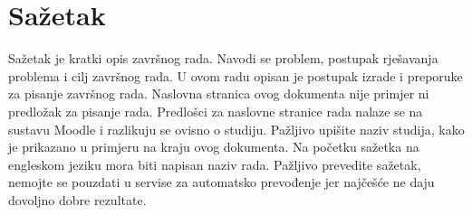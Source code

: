 \section*{Sažetak}
\label{sec:summary}
Sažetak je kratki opis završnog rada. Navodi se problem, postupak rješavanja problema i cilj završnog rada. U ovom radu opisan je postupak izrade i preporuke za pisanje završnog rada. Naslovna stranica ovog dokumenta nije primjer ni predložak za pisanje rada. Predlošci za naslovne stranice rada nalaze se na sustavu Moodle i razlikuju se ovisno o studiju. Pažljivo upišite naziv studija, kako je prikazano u primjeru na kraju ovog dokumenta. Na početku sažetka na engleskom jeziku mora biti napisan naziv rada. Pažljivo prevedite sažetak, nemojte se pouzdati u servise za automatsko prevođenje jer najčešće ne daju dovoljno dobre rezultate.